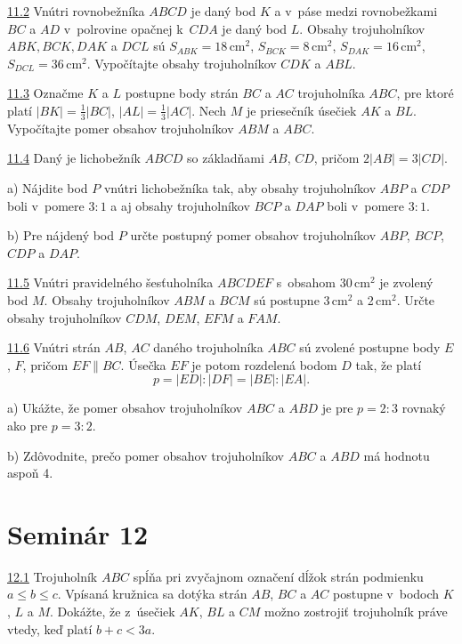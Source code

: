 \noindent \ul{11.2}  Vnútri rovnobežníka $ABCD$ je daný bod $K$ a v~páse medzi rovnobežkami $BC$ a $AD$ v~polrovine opačnej k~$CDA$ je daný bod $L$. Obsahy trojuholníkov $ABK, BCK, DAK$ a $DCL$ sú $S_{ABK} = 18$\,cm$^2$, $S_{BCK} = 8$\,cm$^2$, $S_{DAK} = 16$\,cm$^2$, $S_{DCL} = 36$\,cm$^2$. Vypočítajte obsahy trojuholníkov $CDK$ a $ABL$.




\noindent \ul{11.3}  Označme $K$ a $L$ postupne body strán $BC$ a $AC$ trojuholníka $ABC$, pre ktoré platí $|BK|= \frac{1}{3}|BC|$, $|AL| =\frac{1}{3}|AC|$. Nech $M$ je priesečník úsečiek $AK$ a $BL$. Vypočítajte pomer obsahov trojuholníkov $ABM$ a $ABC$.




\noindent \ul{11.4}   Daný je lichobežník $ABCD$ so základňami $AB$, $CD$, pričom $2|AB| = 3|CD|$.

a) Nájdite bod $P$ vnútri lichobežníka tak, aby obsahy trojuholníkov $ABP$ a $CDP$ boli v~pomere $3 : 1$ a aj obsahy trojuholníkov $BCP$ a $DAP$ boli v~pomere $3 : 1$.

b) Pre nájdený bod $P$ určte postupný pomer obsahov trojuholníkov $ABP$, $BCP$, $CDP$ a $DAP$.




\noindent \ul{11.5}  Vnútri pravidelného šesťuholníka $ABCDEF$ s~obsahom 30\,cm$^2$ je zvolený bod $M$. Obsahy trojuholníkov $ABM$ a $BCM$ sú postupne 3\,cm$^2$ a 2\,cm$^2$. Určte obsahy trojuholníkov $CDM$, $DEM$, $EFM$ a $FAM$.




\noindent \ul{11.6}  Vnútri strán $AB$, $AC$ daného trojuholníka $ABC$ sú zvolené postupne body $E$, $F$, pričom $EF \parallel BC$. Úsečka $EF$ je potom rozdelená bodom $D$ tak, že platí $$p = |ED| : |DF | = |BE| : |EA|.$$

a) Ukážte, že pomer obsahov trojuholníkov $ABC$ a $ABD$ je pre $p = 2 : 3$ rovnaký ako pre $p = 3 : 2$.

b) Zdôvodnite, prečo pomer obsahov trojuholníkov $ABC$ a $ABD$ má hodnotu aspoň 4.




\section*{Seminár 12}

\noindent \ul{12.1}  Trojuholník $ABC$ spĺňa pri zvyčajnom označení dĺžok strán podmienku $a \leq b \leq c$. Vpísaná kružnica sa dotýka strán $AB$, $BC$ a $AC$ postupne v~bodoch $K$, $L$ a $M$. Dokážte, že z~úsečiek $AK$, $BL$ a $CM$ možno zostrojiť trojuholník práve vtedy, keď platí $b + c < 3a$.





